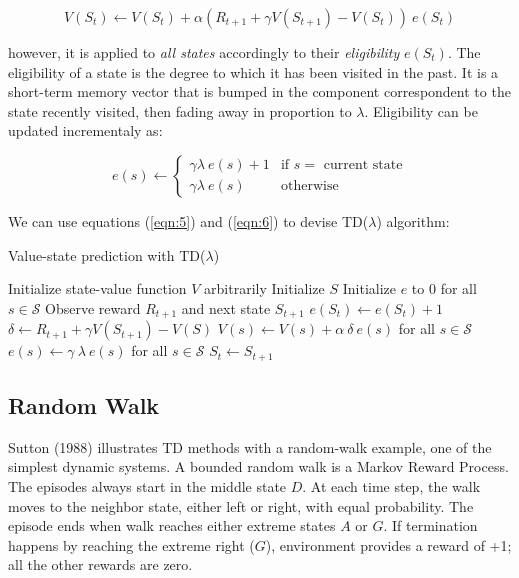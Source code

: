 \documentclass{article}
\begin{document}
\begin{equation}
    V(S_{t}) \leftarrow V(S_{t}) + \alpha (R_{t+1} + \gamma V(S_{t+1}) - V(S_{t})) \: e(S_{t})\label{eqn:5}
\end{equation}

however, it is applied to \emph{all states} accordingly to their \emph{eligibility} $e(S_{t})$.
The eligibility of a state is the degree to which it has been visited in the past.
It is a short-term memory vector that is bumped in the component correspondent to the state recently visited, then fading away in proportion to $\lambda$.
Eligibility can be updated incrementaly as:

\begin{equation}
    e(s) \leftarrow \begin{cases}
                            \gamma \lambda \: e(s) + 1 &\text{if $s =$ current state}\\
                            \gamma \lambda \: e(s) &\text{otherwise}\label{eqn:6}
    \end{cases}
\end{equation}

We can use equations (\ref{eqn:5}) and (\ref{eqn:6}) to devise TD($\lambda$) algorithm:

\begin{algorithm}
    \caption{Value-state prediction with TD($\lambda$)}
    \label{alg:1}
    \begin{algorithmic}
        \State Initialize state-value function $V$ arbitrarily
            \State Initialize $S$
            \State Initialize $e$ to $0$ for all $s \in \mathcal{S}$
             
                \State Observe reward $R_{t+1}$ and next state $S_{t+1}$
                \State $e(S_{t}) \gets e(S_{t}) + 1$
                \State $\delta \gets R_{t+1} + \gamma V(S_{t+1}) - V(S)$
                \State $V(s) \gets V(s) + \alpha \: \delta \: e(s)$ for all $s \in \mathcal{S}$
                \State $e(s) \gets \gamma \: \lambda \: e(s)$ for all $s \in \mathcal{S}$
                \State $S_{t} \gets S_{t+1}$
            \EndFor
        \EndFor
    \end{algorithmic}
\end{algorithm}


\subsection{Random Walk}
\label{subsec:randomwalk}
Sutton (1988) illustrates TD methods with a random-walk example, one of the simplest dynamic systems.
A bounded random walk is a Markov Reward Process.
The episodes always start in the middle state $D$.
At each time step, the walk moves to the neighbor state, either left or right, with equal probability.
The episode ends when walk reaches either extreme states $A$ or $G$.
If termination happens by reaching the extreme right ($G$), environment provides a reward of +1;
all the other rewards are zero.
\end{document}
